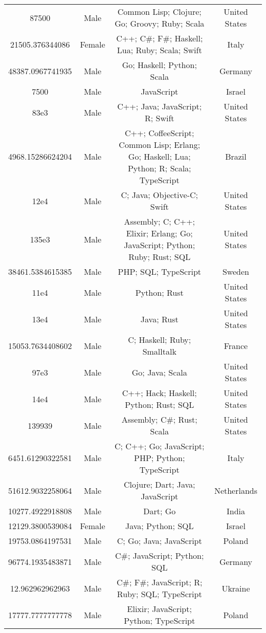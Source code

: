 \begin{center}
\begin{tabular}{ |c|c|c|c| }
87500  &  Male  &  Common Lisp; Clojure; Go; Groovy; Ruby; Scala  &  United States  \\ 
21505.376344086  &  Female  &  C++; C\#; F\#; Haskell; Lua; Ruby; Scala; Swift  &  Italy  \\ 
48387.0967741935  &  Male  &  Go; Haskell; Python; Scala  &  Germany  \\ 
7500  &  Male  &  JavaScript  &  Israel  \\ 
83e3  &  Male  &  C++; Java; JavaScript; R; Swift  &  United States  \\ 
4968.15286624204  &  Male  &  C++; CoffeeScript; Common Lisp; Erlang; Go; Haskell; Lua; Python; R; Scala; TypeScript  &  Brazil  \\ 
12e4  &  Male  &  C; Java; Objective-C; Swift  &  United States  \\ 
135e3  &  Male  &  Assembly; C; C++; Elixir; Erlang; Go; JavaScript; Python; Ruby; Rust; SQL  &  United States  \\ 
38461.5384615385  &  Male  &  PHP; SQL; TypeScript  &  Sweden  \\ 
11e4  &  Male  &  Python; Rust  &  United States  \\ 
13e4  &  Male  &  Java; Rust  &  United States  \\ 
15053.7634408602  &  Male  &  C; Haskell; Ruby; Smalltalk  &  France  \\ 
97e3  &  Male  &  Go; Java; Scala  &  United States  \\ 
14e4  &  Male  &  C++; Hack; Haskell; Python; Rust; SQL  &  United States  \\ 
139939  &  Male  &  Assembly; C\#; Rust; Scala  &  United States  \\ 
6451.61290322581  &  Male  &  C; C++; Go; JavaScript; PHP; Python; TypeScript  &  Italy  \\ 
51612.9032258064  &  Male  &  Clojure; Dart; Java; JavaScript  &  Netherlands  \\ 
10277.4922918808  &  Male  &  Dart; Go  &  India  \\ 
12129.3800539084  &  Female  &  Java; Python; SQL  &  Israel  \\ 
19753.0864197531  &  Male  &  C; Go; Java; JavaScript  &  Poland  \\ 
96774.1935483871  &  Male  &  C\#; JavaScript; Python; SQL  &  Germany  \\ 
12.962962962963  &  Male  &  C\#; F\#; JavaScript; R; Ruby; SQL; TypeScript  &  Ukraine  \\ 
17777.7777777778  &  Male  &  Elixir; JavaScript; Python; TypeScript  &  Poland  \\ 

\end{tabular}
\end{center}

